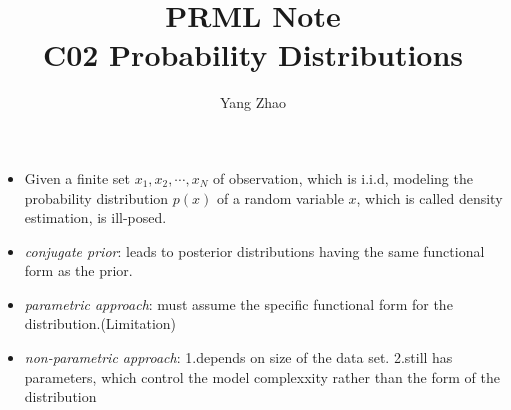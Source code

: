 \documentclass[12pt, a4paper]{article}
\title{PRML Note\\C02 Probability Distributions}
\author{Yang Zhao}
\affil{Department of Automation, Tsinghua University}
\date{}
\begin{document}
    \maketitle
    \begin{itemize}
        \item Given a finite set $x_1,x_2,\cdots,x_N$ of observation, which is i.i.d, modeling
        the probability distribution $p(x)$ of a random variable $x$, which is called density
        estimation, is ill-posed.
        \item \textit{conjugate prior}: leads to posterior distributions having the same 
        functional form as the prior.
        \item \textit{parametric approach}: must assume the specific functional form for the 
        distribution.(Limitation)
        \item \textit{non-parametric approach}: 1.depends on size of the data set. 2.still has 
        parameters, which control the model complexxity rather than the form of the distribution
    \end{itemize}
\end{document}
